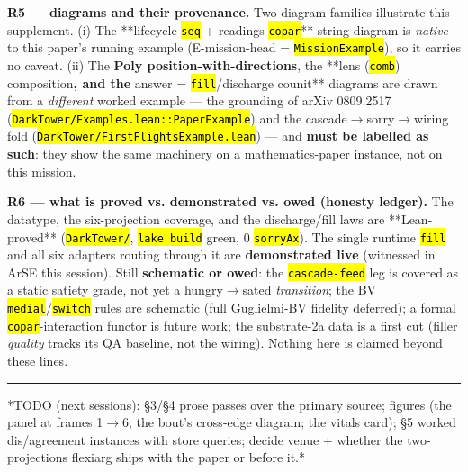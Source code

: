 \documentclass[11pt,oneside]{article}
\newcommand{\scopehl}[1]{\texttt{\hl{#1}}}
\begin{document}
\textbf{R5 --- diagrams and their provenance.} Two diagram families illustrate this
supplement. (i) The **lifecycle \scopehl{seq} + readings \scopehl{copar}** string diagram is
\emph{native} to this paper's running example (E-mission-head = \scopehl{MissionExample}), so
it carries no caveat. (ii) The \textbf{Poly position-with-directions}, the **lens
(\scopehl{comb}) composition\textbf{, and the }answer = \scopehl{fill}/discharge counit** diagrams are
drawn from a \emph{different} worked example --- the grounding of arXiv 0809.2517
(\scopehl{DarkTower/Examples.lean::PaperExample}) and the cascade$\rightarrow$sorry$\rightarrow$wiring fold
(\scopehl{DarkTower/FirstFlightsExample.lean}) --- and \textbf{must be labelled as such}: they
show the same machinery on a mathematics-paper instance, not on this mission.

\textbf{R6 --- what is proved vs. demonstrated vs. owed (honesty ledger).} The
datatype, the six-projection coverage, and the discharge/fill laws are **Lean-
proved** (\scopehl{DarkTower/}, \scopehl{lake build} green, 0 \scopehl{sorryAx}). The single runtime
\scopehl{fill} and all six adapters routing through it are \textbf{demonstrated live} (witnessed
in ArSE this session). Still \textbf{schematic or owed}: the \scopehl{cascade-feed} leg is
covered as a static satiety grade, not yet a hungry$\rightarrow$sated \emph{transition}; the BV
\scopehl{medial}/\scopehl{switch} rules are schematic (full Guglielmi-BV fidelity deferred); a
formal \scopehl{copar}-interaction functor is future work; the substrate-2a data is a
first cut (filler \emph{quality} tracks its QA baseline, not the wiring). Nothing here
is claimed beyond these lines.

\medskip\hrule\medskip

*TODO (next sessions): \S{}3/\S{}4 prose passes over the primary source; figures
(the panel at frames 1$\rightarrow$6; the bout's cross-edge diagram; the vitals card);
\S{}5 worked dis/agreement instances with store queries; decide venue + whether
the two-projections flexiarg ships with the paper or before it.*
\end{document}
